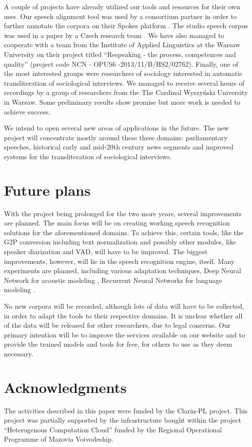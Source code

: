 \documentclass[a4paper,11pt]{article}
\begin{document}
A couple of projects have already utilized our tools and resources for their own uses. Our speech alignment tool was used by a consortium partner in order to further annotate the corpora on their Spokes platform \cite{pezik2015spokes}. The studio speech corpus was used in a paper by a Czech research team \cite{nouza2015polish}. We have also managed to cooperate with a team from the Institute of Applied Linguistics at the Warsaw University on their project titled ``Respeaking - the process, competences and quality'' (project code NCN - OPUS6 -2013/11/B/HS2/02762). Finally, one of the most interested groups were researchers of sociology interested in automatic transliteration of sociological interviews. We managed to receive several hours of recordings by a group of researchers from the The Cardinal Wyszy\'{n}ski University in Warsaw. Some preliminary results show promise but more work is needed to achieve success.

We intend to open several new areas of applications in the future. The new project will concentrate mostly around these three domains: parliamentary speeches, historical early and mid-20th century news segments and improved systems for the transliteration of sociological interviews.


\section{Future plans}

With the project being prolonged for the two more years, several improvements are planned. The main focus will be on creating working speech recognition solutions for the aforementioned domains. To achieve this, certain tools, like the G2P conversion including text normalization and possibly other modules, like speaker diarization and VAD, will have to be improved. The biggest improvements, however, will lie in the speech recognition engine, itself. Many experiments are planned, including various adaptation techniques, Deep Neural Network for acoustic modeling \cite{vu2014multilingual}, Recurrent Neural Networks for language modeling \cite{mikolov2013distributed}.

No new corpora will be recorded, although lots of data will have to be collected, in order to adapt the tools to their respective domains. It is unclear whether all of the data will be released for other researchers, due to legal concerns. Our primary intention will be to improve the services available on our website and to provide the trained models and tools for free, for others to use as they deem necessary.

\section{Acknowledgments}

The activities described in this paper were funded by the Clarin-PL project. This project was partially supported by the infrastructure bought within the project ``Heterogenous Computation Cloud'' funded by the Regional Operational Programme of Mazovia Voivodeship.


\end{document}
